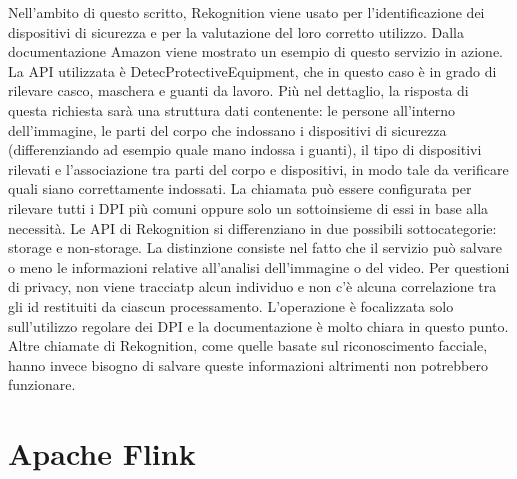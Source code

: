 \noindent Nell'ambito di questo scritto, Rekognition viene usato per l'identificazione dei dispositivi di sicurezza e per la valutazione del loro corretto utilizzo. Dalla documentazione Amazon viene mostrato un esempio di questo servizio in azione. La API utilizzata è DetecProtectiveEquipment, che in questo caso è in grado di rilevare casco, maschera e guanti da lavoro. Più nel dettaglio, la risposta di questa richiesta sarà una struttura dati contenente: le persone all'interno dell'immagine, le parti del corpo che indossano i dispositivi di sicurezza (differenziando ad esempio quale mano indossa i guanti), il tipo di dispositivi rilevati e l'associazione tra parti del corpo e dispositivi, in modo tale da verificare quali siano correttamente indossati. La chiamata può essere configurata per rilevare tutti i DPI più comuni oppure solo un sottoinsieme di essi in base alla necessità. Le API di Rekognition si differenziano in due possibili sottocategorie: storage e non-storage. La distinzione consiste nel fatto che il servizio può salvare o meno le informazioni relative all'analisi dell'immagine o del video. Per questioni di privacy, non viene tracciatp alcun individuo e non c'è alcuna correlazione tra gli id restituiti da ciascun processamento. L'operazione è focalizzata solo sull'utilizzo regolare dei DPI e la documentazione è molto chiara in questo punto. Altre chiamate di Rekognition, come quelle basate sul riconoscimento facciale, hanno invece bisogno di salvare queste informazioni altrimenti non potrebbero funzionare.

\section{Apache Flink}

